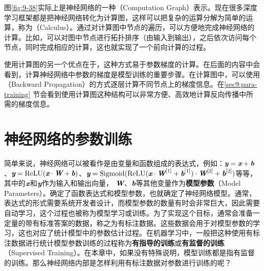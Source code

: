 \parinterval 图\ref{fig:9-38}实际上是神经网络的一种{\small{}}（Computation Graph）表示。现在很多深度学习框架都是把神经网络转化为计算图，这样可以把复杂的运算分解为简单的运算，称为{\small{}}（Calculus）。通过对计算图中节点的遍历，可以方便地完成神经网络的计算。比如，可以对图中节点进行拓扑排序（由输入到输出），之后依次访问每个节点，同时完成相应的计算，这也就实现了一个前向计算的过程。

\parinterval 使用计算图的另一个优点在于，这种方式易于参数梯度的计算。在后面的内容中会看到，计算神经网络中参数的梯度是模型训练的重要步骤。在计算图中，可以使用{\small{}} （Backward Propagation）的方式逐层计算不同节点上的梯度信息。在\ref{sec9:para-training} 节会看到使用计算图这种结构可以非常方便、高效地计算反向传播中所需的梯度信息。


\sectionnewpage
\section{神经网络的参数训练}

\parinterval 简单来说，神经网络可以被看作是由变量和函数组成的表达式，例如：$ {\textbf{\em y}}={\textbf{\em x}}+{\textbf{\em b}} $、$ {\textbf{\em y}}={\textrm{ReLU}}({\textbf{\em x}}\cdot {\textbf{\em W}}+{\textbf{\em b}}) $、$ {\textbf{\em y}}={\textrm{Sigmoid}}({\textrm{ReLU}}({\textbf{\em x}}\cdot {\textbf{\em W}}^{[1]}+{\textbf{\em b}}^{[1]})\cdot {\textbf{\em W}}^{[2]}+{\textbf{\em b}}^{[2]}) $等等，其中的$ {\textbf{\em x}} $和$ {\textbf{\em y}} $作为输入和输出向量， ${\textbf{\em W}}$、${\textbf{\em b}}$等其他变量作为{\small\sffamily\bfseries{模型参数}}（Model Parameters）。确定了函数表达式和模型参数，也就确定了神经网络模型。通常，表达式的形式需要系统开发者设计，而模型参数的数量有时会非常巨大，因此需要自动学习，这个过程也被称为模型学习或训练。为了实现这个目标，通常会准备一定量的带有标准答案的数据，称之为有标注数据。这些数据会用于对模型参数的学习，这也对应了统计模型中的参数估计过程。在机器学习中，一般把这种使用有标注数据进行统计模型参数训练的过程称为{\small\sffamily\bfseries{有指导的训练}}或{\small\sffamily\bfseries{有监督的训练}}（Supervised Training）。在本章中，如果没有特殊说明，模型训练都是指有监督的训练。那么神经网络内部是怎样利用有标注数据对参数进行训练的呢？\\ \\

